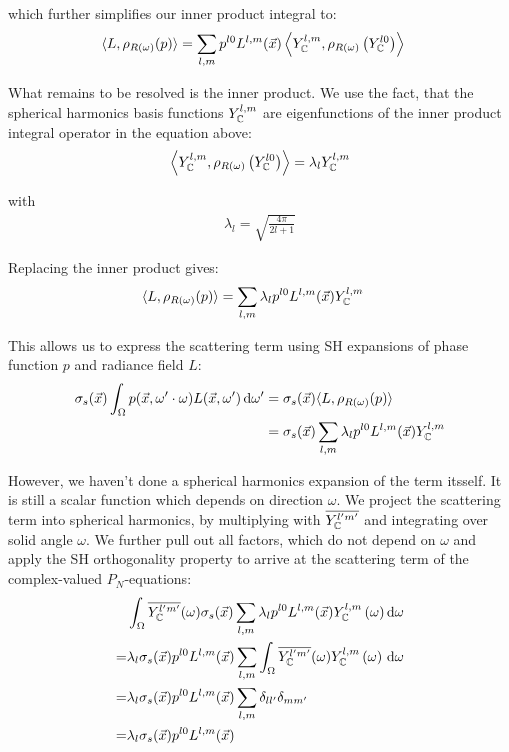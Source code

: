 \documentclass[10pt]{scrartcl}
\begin{document}
which further simplifies our inner product integral to:
\begin{align*}
\langle L,  \rho_{R(\omega)}(p)\rangle
&=
\sum_{l,m}
{
p^{l0}L^{l,m}(\vec{x})
\left<
Y_{\mathbb{C}}^{l,m}, \rho_{R(\omega)}\left(Y_{\mathbb{C}}^{l0} \right )
\right>
}
\end{align*}

What remains to be resolved is the inner product. We use the fact, that the spherical harmonics basis functions $ Y_{\mathbb{C}}^{l,m}$ are eigenfunctions of the inner product integral operator in the equation above:
\begin{align*}
\left<
Y_{\mathbb{C}}^{l,m}, \rho_{R(\omega)}\left ( Y_{\mathbb{C}}^{l0} \right )\right> = \lambda_l Y_{\mathbb{C}}^{l,m}
\end{align*}

with
\begin{align*}
\lambda_l=\sqrt{\frac{4\pi}{2l+1}}
\end{align*}


Replacing the inner product gives:
\begin{align*}
\langle L,  \rho_{R(\omega)}(p)\rangle
&=
\sum_{l,m}
{
\lambda_l
p^{l0}L^{l,m}(\vec{x})
Y_{\mathbb{C}}^{l,m}
}
\end{align*}

This allows us to express the scattering term using SH expansions of phase function $p$ and radiance field $L$:
\begin{align*}
\sigma_s(\vec{x})\int_{\Omega}p(\vec{x}, \omega'\cdot\omega)L(\vec{x}, \omega')\,\mathrm{d}\omega'
&=
\sigma_s(\vec{x})\langle L,  \rho_{R(\omega)}(p)\rangle
\\
&=
\sigma_s(\vec{x})
\sum_{l,m}
{
\lambda_l
p^{l0}L^{l,m}(\vec{x})
Y_{\mathbb{C}}^{l,m}
}
\end{align*}

However, we haven't done a spherical harmonics expansion of the term itsself. It is still a scalar function which depends on direction $\omega$. We project the scattering term into spherical harmonics, by multiplying with $\overline {Y_{\mathbb{C}}^{l'm'}}$ and integrating over solid angle $\omega$. We further pull out all factors, which do not depend on $\omega$ and apply the SH orthogonality property to arrive at the scattering term of the complex-valued $P_N$-equations:
\begin{align}
&
\int_{\Omega}
{
\overline{Y_{\mathbb{C}}^{l'm'}}(\omega)
\sigma_s(\vec{x})
\sum_{l,m}
{
\lambda_l
p^{l0}L^{l,m}(\vec{x})
Y_{\mathbb{C}}^{l,m}\left(\omega\right)
}
\,\mathrm{d}\omega
}
\nonumber\\
=&
\lambda_l
\sigma_s(\vec{x})
p^{l0}L^{l,m}(\vec{x})
\sum_{l,m}
{
\int_{\Omega}
{
\overline{Y_{\mathbb{C}}^{l'm'}}(\omega)
Y_{\mathbb{C}}^{l,m}\left(\omega\right)
\,\mathrm{d}\omega
}
}
\nonumber\\
=&
\lambda_l
\sigma_s(\vec{x})
p^{l0}L^{l,m}(\vec{x})
\sum_{l,m}
{
\delta_{ll'}\delta_{mm'}
}
\nonumber\\
=&
\lambda_l
\sigma_s(\vec{x})
p^{l0}L^{l,m}(\vec{x})
\end{align}
\end{document}
